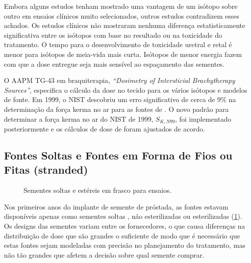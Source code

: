 \documentclass[11pt,a4paper]{article}
\begin{document}
	Embora alguns estudos tenham mostrado uma vantagem de um isótopo sobre outro em ensaios clínicos muito selecionados, outros estudos contradizem esses achados. Os estudos clínicos não mostraram nenhuma diferença estatisticamente significativa entre os isótopos com base no resultado ou na toxicidade do tratamento. O tempo para o desenvolvimento de toxicidade uretral e retal é menor para isótopos de meia-vida mais curta. Isótopos de menor energia fazem com que a dose entregue seja mais sensível ao espaçamento das sementes.

	O AAPM TG-43 em braquiterapia, \textit{``Dosimetry of Intersticial Brachytherapy Sources''}, especifica o cálculo da dose no tecido para os vários isótopos e modelos de fonte. Em 1999, o NIST descobriu um erro significativo de cerca de 9\% na determinação da força kerma no ar para as fontes de . O novo padrão para determinar a força kerma no ar do NIST de 1999, $S_{K,N99}$, foi implementado posteriormente e os cálculos de dose de  foram ajustados de acordo.

\subsection*{Fontes Soltas e Fontes em Forma de Fios ou Fitas (stranded)}

	\begin{figure}
		\centering
		\caption{Sementes soltas e estéreis em frasco para ensaios.}
		\label{fig:semenstesSoltasAssay}
	\end{figure}

	Nos primeiros anos do implante de semente de próstada, as fontes estavam disponíveis apenas como sementes soltas , não esterilizadas ou esterilizadas (\ref{fig:semenstesSoltasAssay}). Os designs das sementes variam entre os fornecedores, o que causa diferenças na distribuição de dose que são grandes o suficiente de modo que é necessário que estas fontes sejam modeladas com precisão no planejamento do tratamento, mas não tão grandes que afetem a decisão sobre qual semente comprar.
\end{document}

